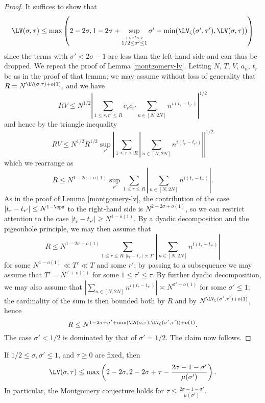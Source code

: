 \begin{proof} It suffices to show that
 $$ \LV(\sigma,\tau) \leq \max\left(2-2\sigma, 1 - 2\sigma + \sup_{\stackrel{1 \leq \tau' \leq \tau}{1/2 \leq \sigma' \leq 1}}  \sigma' + \min(\LV_\zeta(\sigma',\tau'), \LV(\sigma,\tau)) \right)$$
since the terms with $\sigma' < 2\sigma-1$ are less than the left-hand side and can thus be dropped.
    We repeat the proof of Lemma \ref{montgomery-lv}.  Letting $N$, $T$, $V$, $a_n$, $t_r$ be as in the proof of that lemma; we may assume without loss of generality that $R = N^{\LV(\sigma,\tau)+o(1)}$, and we have
    $$ RV \leq N^{1/2} \left|\sum_{1 \leq r,r' \leq R} c_r \overline{c_{r'}} \sum_{n \in [N,2N]} n^{i(t_r-t_{r'})} \right|^{1/2}$$
    and hence by the triangle inequality
    $$ RV \leq N^{1/2} R^{1/2} \sup_{r'} \left|\sum_{1 \leq r \leq R} |\sum_{n \in [N,2N]} n^{i(t_r-t_{r'})}| \right|^{1/2}$$
    which we rearrange as
    $$ R \leq N^{1-2\sigma+o(1)} \sup_{r'} \sum_{1 \leq r \leq R} |\sum_{n \in [N,2N]} n^{i(t_r-t_{r'})}|.$$
    As in the proof of Lemma \ref{montgomery-lv}, the contribution of the case $|t_r - t_{r'}| \leq N^{1-\eps}$ to the right-hand side is $N^{2-2\sigma+o(1)}$, so we can restrict attention to the case $|t_r - t_{r'}| \geq N^{1-o(1)}$.  By a dyadic decomposition and the pigeonhole principle, we may then assume that
    $$ R \leq N^{1-2\sigma+o(1)} \sum_{1 \leq r \leq R: |t_r - t_{r'}| \asymp T'} |\sum_{n \in [N,2N]} n^{i(t_r-t_{r'})}|$$
    for some $N^{1-o(1)} \ll T' \ll T$ and some $r'$; by passing to a subsequence we may assume that $T' = N^{\tau'+o(1)}$ for some $1 \leq \tau' \leq \tau$.  By further dyadic decomposition, we may also assume that
    $ |\sum_{n \in [N,2N]} n^{i(t_r-t_{r'})}| \asymp N^{\sigma'+o(1)}$
    for some $\sigma' \leq 1$; the cardinality of the sum is then bounded both by $R$ and by $N^{\LV_\zeta(\sigma',\tau') + o(1)}$,
    hence
    $$ R \leq N^{1-2\sigma+\sigma' + \min( \LV(\sigma,\tau), \LV_\zeta(\sigma',\tau') ) + o(1)}.$$
    The case $\sigma' < 1/2$ is dominated by that of $\sigma'=1/2$.  The claim now follows.
\end{proof}

\begin{corollary}\label{mu-lv}  If $1/2 \leq \sigma, \sigma' \leq 1$, and $\tau \geq 0$ are fixed, then
    $$\LV(\sigma,\tau) \leq \max\left( 2-2\sigma, 2 - 2\sigma + \tau - \frac{2\sigma-1-\sigma'}{\mu(\sigma')} \right).$$
    In particular, the Montgomery conjecture holds for $\tau \leq \frac{2\sigma-1-\sigma'}{\mu(\sigma')}$.
\end{corollary}

